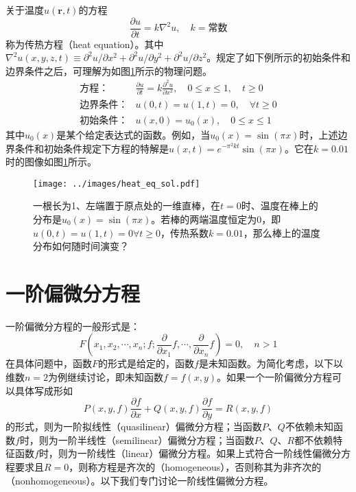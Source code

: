 \documentclass[main.tex]{subfiles}
\begin{document}
\begin{example}[传热方程]
    关于温度$u\left(\mathbf{r},t\right)$的方程
    \[
        \frac{\partial u}{\partial t}=k\nabla^2u,\quad k=\text{常数}
    \]
    称为传热方程（heat equation）。其中$\nabla^2 u\left(x,y,z,t\right)\equiv\partial^2 u/\partial x^2+\partial^2 u/\partial y^2+\partial^2 u/\partial z^2$。规定了如下例所示的初始条件和边界条件之后，可理解为如图\ref{fig:heat_eq_sol}所示的物理问题。
    \begin{align*}
        \text{方程：}   & \frac{\partial u}{\partial t}=k\frac{\partial^2 u}{\partial x^2},\quad 0\leq x\leq 1,\quad t\geq 0 \\
        \text{边界条件：} & u\left(0,t\right)=u\left(1,t\right)=0,\quad\forall t\geq 0                                         \\
        \text{初始条件：} & u\left(x,0\right)=u_0\left(x\right),\quad 0\leq x\leq 1
    \end{align*}
    其中$u_0\left(x\right)$是某个给定表达式的函数。例如，当$u_0\left(x\right)=\sin\left(\pi x\right)$时，上述边界条件和初始条件规定下方程的特解是$u\left(x,t\right)=e^{-\pi^2kt}\sin\left(\pi x\right)$。它在$k=0.01$时的图像如图\ref{fig:heat_eq_sol}所示。
\end{example}

\begin{figure}[ht]
    \centering
    \texttt{[image: ../images/heat\_eq\_sol.pdf]}
    \caption{一根长为1、左端置于原点处的一维直棒，在$t=0$时、温度在棒上的分布是$u_0\left(x\right)=\sin\left(\pi x\right)$。若棒的两端温度恒定为0，即$u\left(0,t\right)=u\left(1,t\right)=0\forall t\geq 0$，传热系数$k=0.01$，那么棒上的温度分布如何随时间演变？}
    \label{fig:heat_eq_sol}
\end{figure}

\section{一阶偏微分方程}
一阶偏微分方程的一般形式是：
\[
    F\left(x_1,x_2,\cdots,x_n;f;\frac{\partial}{\partial x_1}f,\cdots,\frac{\partial}{\partial x_n}f\right)=0,\quad n>1
\]
在具体问题中，函数$F$的形式是给定的，函数$f$是未知函数。为简化考虑，以下以维数$n=2$为例继续讨论，即未知函数$f=f\left(x,y\right)$。如果一个一阶偏微分方程可以具体写成形如
\begin{equation}\label{eq:linear_PDE}
    P\left(x,y,f\right)\frac{\partial f}{\partial x}+Q\left(x,y,f\right)\frac{\partial f}{\partial y}=R\left(x,y,f\right)
\end{equation}
的形式，则为一阶拟线性（quasilinear）偏微分方程；当函数$P$、$Q$不依赖未知函数$f$时，则为一阶半线性（semilinear）偏微分方程；当函数$P$、$Q$、$R$都不依赖特征函数$f$时，则为一阶线性（linear）偏微分方程。如果上式符合一阶线性偏微分方程要求且$R=0$，则称方程是齐次的（homogeneous），否则称其为非齐次的（nonhomogeneous）。以下我们专门讨论一阶线性偏微分方程。
\end{document}
